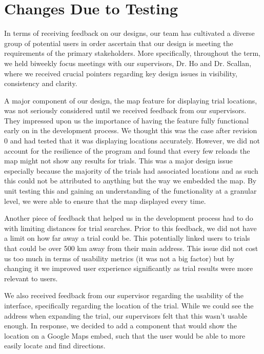 \documentclass[12pt, titlepage]{article}
\begin{document}
\section{Changes Due to Testing}

In terms of receiving feedback on our designs, our team has cultivated a diverse group of potential users
in order ascertain that our design is meeting the requirements of the primary stakeholders.
More specifically, throughout the term,
we held biweekly focus meetings with our supervisors, Dr. Ho and Dr. Scallan, where we received crucial
pointers regarding key design issues in visibility, consistency and clarity. \newline

A major component of our design, the map feature for displaying trial locations,
was not seriously considered until we received feedback from our supervisors. They impressed upon
us the importance of having the feature fully functional early on in the development process.
We thought this was the case after revision 0 and had tested that it was displaying locations
accurately. However, we did not account for the resilience of the program and found that every few reloads
the map might not show any results for trials. This was a major design issue
especially because the majority of the trials had associated locations and as such this could not be
attributed to anything but the way we embedded the map.
By unit testing this and gaining an understanding of the functionality at a granular level,
we were able to ensure that the map displayed every time. \newline

Another piece of feedback that helped us in the development process
had to do with limiting distances for trial searches. Prior to this feedback,
we did not have a limit on how far away a trial could be. This potentially linked
users to trials that could be over 500 km away from their main address. This issue did not
cost us too much in terms of usability metrics (it was not a big factor) but by changing it
we improved user experience significantly as trial results were more relevant to users. \newline

We also received feedback from our supervisor regarding the usability of the interface, specifically regarding
the location of the trial. While we could see the address when expanding the trial, our supervisors felt that this
wasn't usable enough. In response, we decided to add a component that would show the location on a Google
Maps embed, such that the user would be able to more easily locate and find directions. \newline
\end{document}
